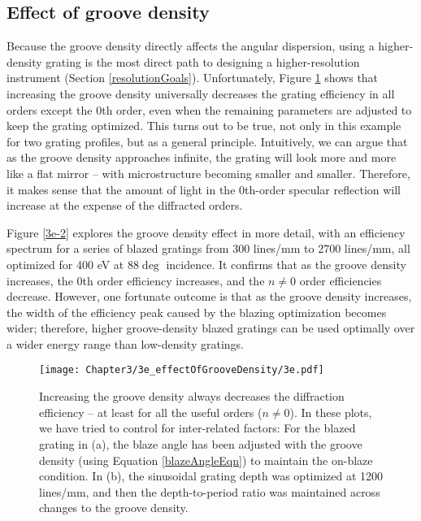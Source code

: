 \subsection{Effect of groove density}
Because the groove density directly affects the angular dispersion, using a higher-density grating is the most direct path to designing a higher-resolution instrument (Section \ref{resolutionGoals}).  Unfortunately, Figure \ref{3e} shows that increasing the groove density universally decreases the grating efficiency in all orders except the 0th order, even when the remaining parameters are adjusted to keep the grating optimized.  This turns out to be true, not only in this example for two grating profiles, but as a general principle.  Intuitively, we can argue that as the groove density approaches infinite, the grating will look more and more like a flat mirror -- with microstructure becoming smaller and smaller.  Therefore, it makes sense that the amount of light in the 0th-order specular reflection will increase at the expense of the diffracted orders.

Figure \ref{3e-2} explores the groove density effect in more detail, with an efficiency spectrum for a series of blazed gratings from 300 lines/mm to 2700 lines/mm, all optimized for 400 eV at 88$\deg$ incidence.  It confirms that as the groove density increases, the 0th order efficiency increases, and the $n\neq0$ order efficiencies decrease.  However, one fortunate outcome is that as the groove density increases, the width of the efficiency peak caused by the blazing optimization becomes wider; therefore, higher groove-density blazed gratings can be used optimally over a wider energy range than low-density gratings.
	
\begin{figure}[htbp] %
   \centering
   \texttt{[image: Chapter3/3e\_effectOfGrooveDensity/3e.pdf]} 
   \caption{Increasing the groove density always decreases the diffraction efficiency -- at least for all the useful orders ($n \neq 0$).  In these plots, we have tried to control for inter-related factors: For the blazed grating in (a), the blaze angle has been adjusted with the groove density (using Equation \ref{blazeAngleEqn}) to maintain the on-blaze condition.  In (b), the sinusoidal grating depth was optimized at 1200 lines/mm, and then the depth-to-period ratio was maintained across changes to the groove density.}
   \label{3e}
\end{figure}

